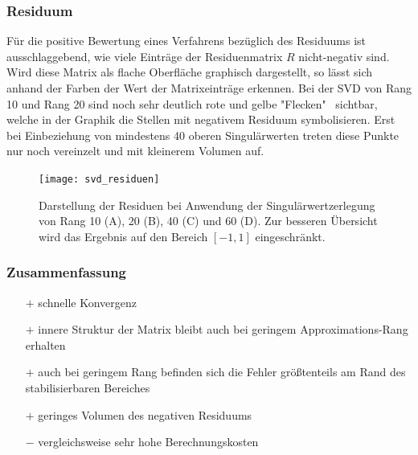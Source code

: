 \documentclass[12pt,a4paper,twoside]{article}
\begin{document}
\subsubsection*{Residuum}
Für die positive Bewertung eines Verfahrens bezüglich des Residuums ist ausschlaggebend, wie viele Einträge der Residuenmatrix $R$ nicht-negativ sind. Wird diese Matrix als flache Oberfläche graphisch dargestellt, so lässt sich anhand der Farben der Wert der Matrixeinträge erkennen. Bei der SVD von Rang 10 und Rang 20 sind noch sehr deutlich rote und gelbe "Flecken" \ sichtbar, welche in der Graphik die Stellen mit negativem Residuum symbolisieren. Erst bei  Einbeziehung von mindestens 40 oberen Singulärwerten treten diese Punkte nur noch vereinzelt und mit kleinerem Volumen auf.
\begin{figure}[h]
	\center
	\texttt{[image: svd\_residuen]}
	\caption{Darstellung der Residuen bei Anwendung der Singulärwertzerlegung von Rang 10 (A), 20 (B), 40 (C) und 60 (D). Zur besseren Übersicht wird das Ergebnis auf den Bereich $[-1,1]$ eingeschränkt.}
\end{figure}
\subsubsection*{Zusammenfassung}
\begin{itemize}
	\item[$+$] schnelle Konvergenz
	\item[$+$] innere Struktur der Matrix bleibt auch bei geringem Approximations-Rang erhalten
	\item[$+$] auch bei geringem Rang befinden sich die Fehler größtenteils am Rand des stabilisierbaren Bereiches
	\item[$+$] geringes Volumen des negativen Residuums
	\item[$-$] vergleichsweise sehr hohe Berechnungskosten
\end{itemize}
\newpage
\end{document}
